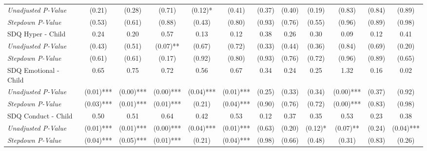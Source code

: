 \begin{tabular}{l c c c c c c c c c c c}
\quad \textit{Unadjusted P-Value} & (0.21) & (0.28) & (0.71) & (0.12)* & (0.41) & (0.37) & (0.40) & (0.19) & (0.83) & (0.84) & (0.89) \\
\quad \textit{Stepdown P-Value} & (0.53) & (0.61) & (0.88) & (0.43) & (0.80) & (0.93) & (0.76) & (0.55) & (0.96) & (0.89) & (0.98) \\
SDQ Hyper - Child & 0.24 & 0.20 & 0.57 & 0.13 & 0.12 & 0.38 & 0.26 & 0.30 & 0.09 & 0.12 & 0.41 \\
\quad \textit{Unadjusted P-Value} & (0.43) & (0.51) & (0.07)** & (0.67) & (0.72) & (0.33) & (0.44) & (0.36) & (0.84) & (0.69) & (0.20) \\
\quad \textit{Stepdown P-Value} & (0.61) & (0.61) & (0.17) & (0.92) & (0.80) & (0.93) & (0.76) & (0.72) & (0.96) & (0.89) & (0.65) \\
SDQ Emotional - Child & 0.65 & 0.75 & 0.72 & 0.56 & 0.67 & 0.34 & 0.24 & 0.25 & 1.32 & 0.16 & 0.02 \\
\quad \textit{Unadjusted P-Value} & (0.01)*** & (0.00)*** & (0.00)*** & (0.04)*** & (0.01)*** & (0.25) & (0.33) & (0.34) & (0.00)*** & (0.37) & (0.92) \\
\quad \textit{Stepdown P-Value} & (0.03)*** & (0.01)*** & (0.01)*** & (0.21) & (0.04)*** & (0.90) & (0.76) & (0.72) & (0.00)*** & (0.83) & (0.98) \\
SDQ Conduct - Child & 0.50 & 0.51 & 0.64 & 0.42 & 0.53 & 0.12 & 0.37 & 0.35 & 0.53 & 0.23 & 0.38 \\
\quad \textit{Unadjusted P-Value} & (0.01)*** & (0.01)*** & (0.00)*** & (0.04)*** & (0.01)*** & (0.63) & (0.20) & (0.12)* & (0.07)** & (0.24) & (0.04)*** \\
\quad \textit{Stepdown P-Value} & (0.04)*** & (0.05)*** & (0.01)*** & (0.21) & (0.04)*** & (0.98) & (0.66) & (0.48) & (0.31) & (0.83) & (0.26) \\
\bottomrule
\end{tabular}
